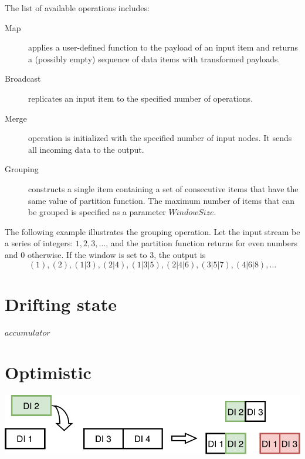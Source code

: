 \documentclass[a0,landscape]{a0poster}
\begin{document}
\begin{multicols*}{3}
The list of available operations includes:

\begin{description}
  \item [Map] applies a user-defined function to the payload of an input item and returns a (possibly empty) sequence of data items with transformed payloads. 
  \item [Broadcast] replicates an input item to the specified number of operations.
  \item [Merge] operation is initialized with the specified number of input nodes. It sends all incoming data to the output.
  \item [Grouping] constructs a single item containing a set of consecutive items that have the same value of partition function. The maximum number of items that can be grouped is specified as a parameter  $Window Size.$ 
\end{description}

The following example illustrates  the grouping operation. 
Let the input stream be a series of integers: $ 1,2,3, \ldots$, and the  partition function returns for even numbers and 0 otherwise. If the window is set to 3, the output is 
$$(1), (2), (1|3), (2|4), (1|3|5), (2|4|6), (3|5|7), (4|6|8), \ldots$$

\section*{Drifting state}

\begin{minipage}{\linewidth}
  \begin{algorithmic}
      \State $accumulator$ 
        \State {}
      \EndFor
      \State \Return {}
    \EndFunction
  \end{algorithmic}
\end{minipage}

\section*{Optimistic}

\begin{minipage}{\linewidth}
  \includegraphics[width=\linewidth]{pics/grouping-replaying}
  \label {grouping-replaying}
\end{minipage}


\end{multicols*}
\end{document}
